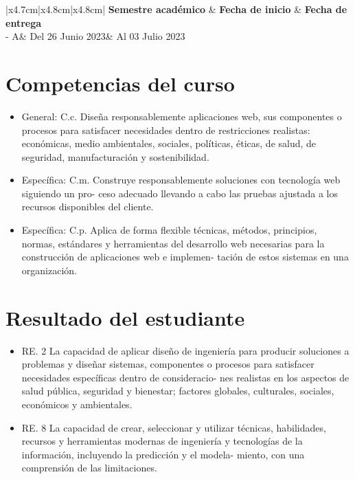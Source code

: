 \documentclass{article}
\newcommand{\itemAcademic}{2023 - A}
\newcommand{\itemInput}{Del 26 Junio 2023}
\newcommand{\itemOutput}{Al 03 Julio 2023}
\begin{document}
	\begin{table}[H]
		\begin{tabular}{|x{4.7cm}|x{4.8cm}|x{4.8cm}|}
			\hline 
			\color{white}\textbf{Semestre académico} & \color{white}\textbf{Fecha de inicio}  & \color{white}\textbf{Fecha de entrega}   \\
			\hline 
			\itemAcademic & \itemInput &  \itemOutput  \\
			\hline 
		\end{tabular}
	\end{table}
	
	\section{Competencias del curso}
	\begin{itemize}		
		\item General: C.c. Diseña responsablemente aplicaciones web, sus componentes o procesos para satisfacer necesidades dentro de restricciones realistas: económicas, medio ambientales, sociales, políticas, éticas, de salud, de seguridad, manufacturación y sostenibilidad.
		\item Específica: C.m. Construye responsablemente soluciones con tecnología web siguiendo un pro-
            ceso adecuado llevando a cabo las pruebas ajustada a los recursos disponibles del cliente.
		\item Específica: C.p. Aplica de forma flexible técnicas, métodos, principios, normas, estándares y
            herramientas del desarrollo web necesarias para la construcción de aplicaciones web e implemen-
            tación de estos sistemas en una organización.
	\end{itemize}
 
    \section{Resultado del estudiante}
    \begin{itemize}
        \item RE. 2 La capacidad de aplicar diseño de ingeniería para producir soluciones a problemas y diseñar
            sistemas, componentes o procesos para satisfacer necesidades específicas dentro de consideracio-
            nes realistas en los aspectos de salud pública, seguridad y bienestar; factores globales, culturales,
            sociales, económicos y ambientales.
        \item RE. 8 La capacidad de crear, seleccionar y utilizar técnicas, habilidades, recursos y herramientas
            modernas de ingeniería y tecnologías de la información, incluyendo la predicción y el modela-
            miento, con una comprensión de las limitaciones.
    \end{itemize}
		
\end{document}

